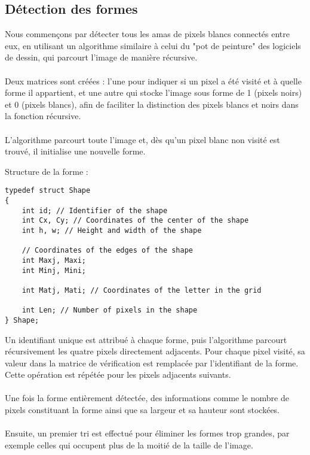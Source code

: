 \documentclass{article}
\begin{document}
\subsection{Détection des formes}

Nous commençons par détecter tous les amas de pixels blancs connectés entre eux, en utilisant un algorithme similaire à celui du "pot de peinture" des logiciels de dessin, qui parcourt l'image de manière récursive.
\\\\
Deux matrices sont créées : l'une pour indiquer si un pixel a été visité et à quelle forme il appartient, et une autre qui stocke l'image sous forme de 1 (pixels noirs) et 0 (pixels blancs), afin de faciliter la distinction des pixels blancs et noirs dans la fonction récursive.
\\\\
L'algorithme parcourt toute l'image et, dès qu'un pixel blanc non visité est trouvé, il initialise une nouvelle forme.

\noindent Structure de la forme :
\begin{lstlisting}
typedef struct Shape 
{
    int id; // Identifier of the shape
    int Cx, Cy; // Coordinates of the center of the shape
    int h, w; // Height and width of the shape

    // Coordinates of the edges of the shape
    int Maxj, Maxi;
    int Minj, Mini;

    int Matj, Mati; // Coordinates of the letter in the grid

    int Len; // Number of pixels in the shape
} Shape;

\end{lstlisting}

\vspace{0.5cm}
\newpage
Un identifiant unique est attribué à chaque forme, puis l'algorithme parcourt récursivement les quatre pixels directement adjacents. Pour chaque pixel visité, sa valeur dans la matrice de vérification est remplacée par l’identifiant de la forme. Cette opération est répétée pour les pixels adjacents suivants.
\\\\
Une fois la forme entièrement détectée, des informations comme le nombre de pixels constituant la forme ainsi que sa largeur et sa hauteur sont stockées.
\\\\
Ensuite, un premier tri est effectué pour éliminer les formes trop grandes, par exemple celles qui occupent plus de la moitié de la taille de l'image.
\end{document}
